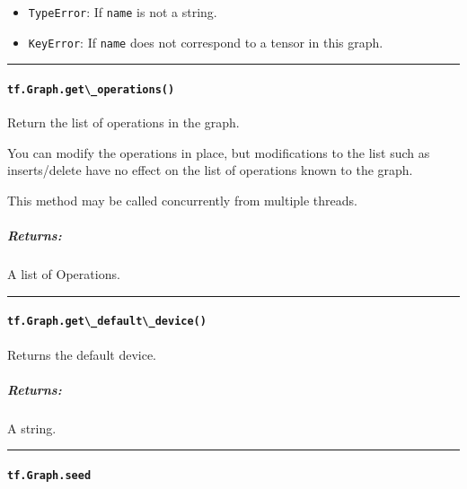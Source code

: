 \begin{itemize}
\tightlist
\item
  \lstinline{TypeError}: If \lstinline{name} is not a string.
\item
  \lstinline{KeyError}: If \lstinline{name} does not correspond to a tensor in
  this graph.
\end{itemize}

\begin{center}\rule{0.5\linewidth}{\linethickness}\end{center}

\paragraph{\texorpdfstring{\lstinline{tf.Graph.get\_operations()}
}{tf.Graph.get\_operations() }}\label{tf.graph.getux5foperations}

Return the list of operations in the graph.

You can modify the operations in place, but modifications to the list
such as inserts/delete have no effect on the list of operations known to
the graph.

This method may be called concurrently from multiple threads.

\subparagraph{Returns: }\label{returns-9}

A list of Operations.

\begin{center}\rule{0.5\linewidth}{\linethickness}\end{center}

\paragraph{\texorpdfstring{\lstinline{tf.Graph.get\_default\_device()}
}{tf.Graph.get\_default\_device() }}\label{tf.graph.getux5fdefaultux5fdevice}

Returns the default device.

\subparagraph{Returns: }\label{returns-10}

A string.

\begin{center}\rule{0.5\linewidth}{\linethickness}\end{center}

\paragraph{\texorpdfstring{\lstinline{tf.Graph.seed}
}{tf.Graph.seed }}\label{tf.graph.seed}


